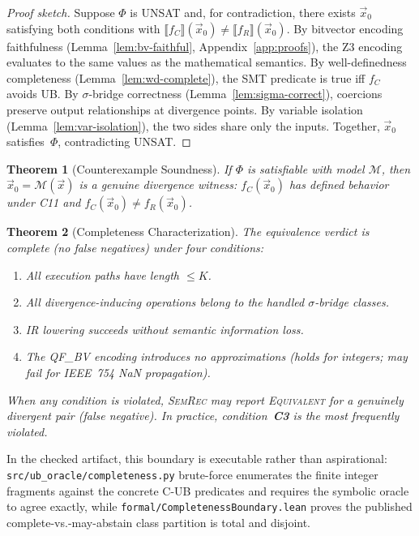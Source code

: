 \documentclass[10pt,a4paper]{article}
\newtheorem{theorem}{Theorem}
\begin{document}
\begin{proof}[Proof sketch]
Suppose $\Phi$ is UNSAT and, for contradiction, there exists
$\vec{x}_0$ satisfying both conditions with
$\llbracket f_C \rrbracket(\vec{x}_0) \neq
\llbracket f_R \rrbracket(\vec{x}_0)$.
By bitvector encoding faithfulness (Lemma~\ref{lem:bv-faithful},
Appendix~\ref{app:proofs}), the Z3 encoding evaluates to the
same values as the mathematical semantics.
By well-definedness completeness (Lemma~\ref{lem:wd-complete}),
the SMT predicate is true iff $f_C$ avoids UB.
By $\sigma$-bridge correctness (Lemma~\ref{lem:sigma-correct}),
coercions preserve output relationships at divergence points.
By variable isolation (Lemma~\ref{lem:var-isolation}), the two sides
share only the inputs.  Together, $\vec{x}_0$ satisfies~$\Phi$,
contradicting UNSAT.
\end{proof}

\begin{theorem}[Counterexample Soundness]\label{thm:cex-sound}
If $\Phi$ is satisfiable with model $\mathcal{M}$, then
$\vec{x}_0 = \mathcal{M}(\vec{x})$ is a genuine divergence witness:
$f_C(\vec{x}_0)$ has defined behavior under C11 and
$f_C(\vec{x}_0) \neq f_R(\vec{x}_0)$.
\end{theorem}

\begin{theorem}[Completeness Characterization]\label{thm:completeness}
The equivalence verdict is \emph{complete} (no false negatives) under
four conditions:
\begin{enumerate}[nosep,label=\textbf{C\arabic*}:]
  \item All execution paths have length $\leq K$.
  \item All divergence-inducing operations belong to the handled
    $\sigma$-bridge classes.
  \item IR lowering succeeds without semantic information loss.
  \item The QF\_BV encoding introduces no approximations (holds for
    integers; may fail for IEEE~754 NaN propagation).
\end{enumerate}
When any condition is violated, \textsc{SemRec} may report
\textsc{Equivalent} for a genuinely divergent pair (false negative).
In practice, condition~\textbf{C3} is the most frequently violated.
\end{theorem}

In the checked artifact, this boundary is executable rather than aspirational:
\texttt{src/ub\_oracle/completeness.py} brute-force enumerates the finite
integer fragments against the concrete C-UB predicates and requires the symbolic
oracle to agree exactly, while \texttt{formal/CompletenessBoundary.lean} proves
the published complete-vs.-may-abstain class partition is total and disjoint.
\end{document}
